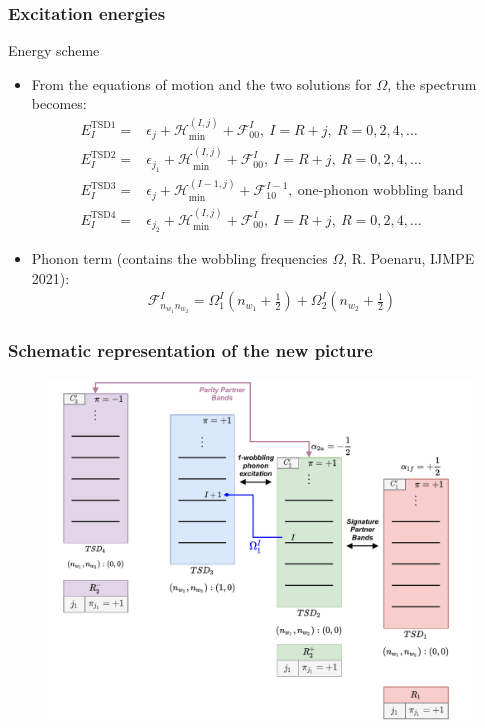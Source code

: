 \documentclass[
	11pt, %
]{beamer}
\begin{document}
\begin{frame}
	\frametitle{Excitation energies}
	\begin{block}{Energy scheme}
		\begin{itemize}
			\item From the equations of motion and the two solutions for $\Omega$, the spectrum becomes:
			\begin{align}
				E_I^\text{TSD1}=&\epsilon_{j}+\mathcal{H}_\text{min}^{(I,j)}+\mathcal{F}_{00}^{I},\ I=R+j,\ R=0,2,4,\dots\nonumber\\
				E_I^\text{TSD2}=&\epsilon_{j_1}+\mathcal{H}_\text{min}^{(I,j)}+\mathcal{F}_{00}^{I},\ I=R+j,\ R=0,2,4,\dots\nonumber\\
				E_I^\text{TSD3}=&\epsilon_{j}+\mathcal{H}_\text{min}^{(I-1,j)}+\mathcal{F}_{10}^{I-1},\ \text{one-phonon wobbling band}\nonumber\\
				E_I^\text{TSD4}=&\epsilon_{j_2}+\mathcal{H}_\text{min}^{(I,j)}+\mathcal{F}_{00}^{I},\ I=R+j,\ R=0,2,4,\dots
			\end{align}
			\item Phonon term (contains the wobbling frequencies $\Omega$, R. Poenaru, IJMPE 2021):
			\begin{align}
				\mathcal{F}_{n_{w_1}n_{w_2}}^{I}=\Omega_1^I\left(n_{w_1}+\frac{1}{2}\right)+\Omega_2^I\left(n_{w_2}+\frac{1}{2}\right)
			\end{align}
		\end{itemize}
	\end{block}
\end{frame}

\begin{frame}
	\frametitle{Schematic representation of the new picture}
	\vspace{-0.3cm}
	\begin{figure}
		\centering
		\includegraphics[scale=0.45]{figures/W2_Approach.pdf}
	\end{figure}
\end{frame}
	
\end{document}
